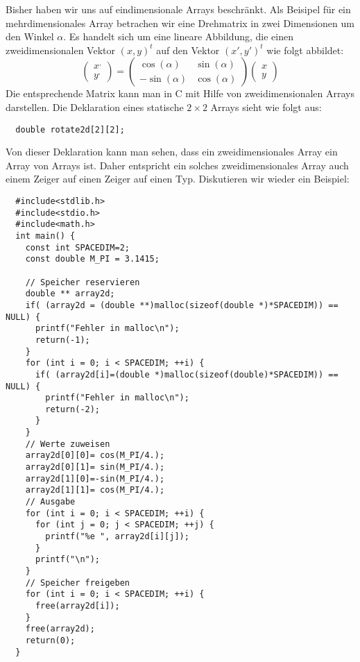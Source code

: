Bisher haben wir uns auf eindimensionale Arrays beschränkt.
Als Beisipel für ein mehrdimensionales Array betrachen wir eine Drehmatrix in zwei Dimensionen um den Winkel $\alpha$. 
Es handelt sich um eine lineare Abbildung, die einen zweidimensionalen Vektor $(x,y)^t$ auf den Vektor $(x',y')^t$ wie folgt abbildet:
\begin{equation}
  \left(\begin{array}{c}x^{,}\\y^{,}\end{array}\right)=
  \left(\begin{array}{cc} \cos\left(\alpha\right) & \sin\left(\alpha\right) \\
    -\sin\left(\alpha\right) & \cos\left(\alpha\right) 
  \end{array}\right)
  \left(\begin{array}{c}x\\y\end{array}\right)
\end{equation}
Die entsprechende Matrix kann man in C mit Hilfe von zweidimensionalen Arrays darstellen.
Die Deklaration eines statische $2\times2$ Arrays sieht wie folgt aus:
\begin{lstlisting}
  double rotate2d[2][2];
\end{lstlisting}
Von dieser Deklaration kann man sehen, dass ein zweidimensionales Array ein Array von Arrays ist.
Daher entspricht ein solches zweidimensionales Array auch einem Zeiger auf einen Zeiger auf einen Typ.
Diskutieren wir wieder ein Beispiel:
\begin{lstlisting}
  #include<stdlib.h>
  #include<stdio.h>
  #include<math.h>
  int main() {
    const int SPACEDIM=2;
    const double M_PI = 3.1415;

    // Speicher reservieren
    double ** array2d;
    if( (array2d = (double **)malloc(sizeof(double *)*SPACEDIM)) == NULL) {
      printf("Fehler in malloc\n");
      return(-1);
    }
    for (int i = 0; i < SPACEDIM; ++i) {
      if( (array2d[i]=(double *)malloc(sizeof(double)*SPACEDIM)) == NULL) {
        printf("Fehler in malloc\n");
        return(-2);
      }
    }
    // Werte zuweisen
    array2d[0][0]= cos(M_PI/4.); 
    array2d[0][1]= sin(M_PI/4.); 
    array2d[1][0]=-sin(M_PI/4.); 
    array2d[1][1]= cos(M_PI/4.); 
    // Ausgabe
    for (int i = 0; i < SPACEDIM; ++i) {
      for (int j = 0; j < SPACEDIM; ++j) {
        printf("%e ", array2d[i][j]);
      }
      printf("\n");
    }
    // Speicher freigeben
    for (int i = 0; i < SPACEDIM; ++i) {
      free(array2d[i]);
    }
    free(array2d);
    return(0);
  }
\end{lstlisting}
